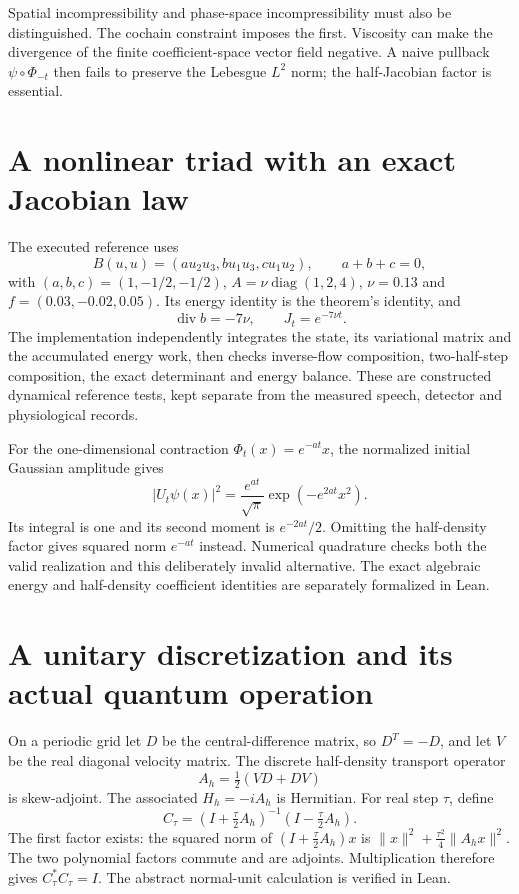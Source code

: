 Spatial incompressibility and phase-space incompressibility must also be distinguished. The cochain constraint imposes the first. Viscosity can make the divergence of the finite coefficient-space vector field negative. A naive pullback $\psi\circ\Phi_{-t}$ then fails to preserve the Lebesgue $L^2$ norm; the half-Jacobian factor is essential.

\section{A nonlinear triad with an exact Jacobian law}

The executed reference uses
\[
 B(u,u)=(a u_2u_3,b u_1u_3,c u_1u_2),\qquad a+b+c=0,
\]
with $(a,b,c)=(1,-1/2,-1/2)$, $A=\nu\operatorname{diag}(1,2,4)$, $\nu=0.13$ and $f=(0.03,-0.02,0.05)$. Its energy identity is the theorem's identity, and
\[
 \operatorname{div}b=-7\nu,\qquad J_t=e^{-7\nu t}.
\]
The implementation independently integrates the state, its variational matrix and the accumulated energy work, then checks inverse-flow composition, two-half-step composition, the exact determinant and energy balance. These are constructed dynamical reference tests, kept separate from the measured speech, detector and physiological records.

For the one-dimensional contraction $\Phi_t(x)=e^{-at}x$, the normalized initial Gaussian amplitude gives
\[
 |U_t\psi(x)|^2=\frac{e^{at}}{\sqrt\pi}\exp(-e^{2at}x^2).
\]
Its integral is one and its second moment is $e^{-2at}/2$. Omitting the half-density factor gives squared norm $e^{-at}$ instead. Numerical quadrature checks both the valid realization and this deliberately invalid alternative. The exact algebraic energy and half-density coefficient identities are separately formalized in Lean.

\section{A unitary discretization and its actual quantum operation}

On a periodic grid let $D$ be the central-difference matrix, so $D^T=-D$, and let $V$ be the real diagonal velocity matrix. The discrete half-density transport operator
\[
 A_h=\tfrac12(VD+DV)
\]
is skew-adjoint. The associated $H_h=-iA_h$ is Hermitian. For real step $\tau$, define
\[
 C_\tau=(I+\tfrac\tau2A_h)^{-1}(I-\tfrac\tau2A_h).
\]
The first factor exists: the squared norm of $(I+\frac\tau2A_h)x$ is $\|x\|^2+\frac{\tau^2}{4}\|A_hx\|^2$. The two polynomial factors commute and are adjoints. Multiplication therefore gives $C_\tau^*C_\tau=I$. The abstract normal-unit calculation is verified in Lean.

